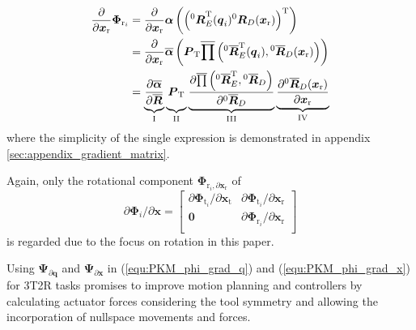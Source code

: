 \documentclass[twocolumn,10pt]{IFTOMM}
\newcommand{\bm}[1]{\boldsymbol{#1}}
\newcommand{\rotmat}[2]{{{ }^{#1}\boldsymbol{R}}_{#2}}
\newcommand{\rotmato}[2]{{{ }^{#1}\boldsymbol{\overline{R}}}_{#2}}
\newcommand{\transp}[0]{{\mathrm{T}}}
\begin{document}
\begin{align}
\frac{\partial}{\partial \bm{x}_{\mathrm{r}}}\bm{\Phi}_{\mathrm{r}_i}
&=
\frac{\partial}{\partial \bm{x}_{\mathrm{r}}} \bm{\alpha}\left(\left(\rotmat{0}{E}^\transp(\bm{q}_i) \rotmat{0}{D}(\bm{x}_{\mathrm{r}})\right)^\transp\right) \label{equ:grad_Phi_x} \\
&=
\frac{\partial}{\partial \bm{x}_{\mathrm{r}}} \overline{\bm{\alpha}}\left(
\bm{P}_{\mathrm{T}}
\overline{\prod}\left( \rotmato{0}{E}^\transp(\bm{q}_i), \rotmato{0}{D}(\bm{x}_{\mathrm{r}})\right)\right) \nonumber \\
&=
\underbrace{\vphantom{\frac{\partial \overline{\prod}\left( \rotmato{0}{E}^\transp, \rotmato{0}{D}\right)}{\partial \rotmato{0}{D}}}
    \frac{\partial \overline{\bm{\alpha}}}{\partial \overline{\bm{R}}}}_{\mathrm{I}}
\underbrace{\vphantom{\frac{\partial \overline{\prod}\left( \rotmato{0}{E}^\transp, \rotmato{0}{D}\right)}{\partial \rotmato{0}{D}}}
    \bm{P}_{\mathrm{T}}}_{\mathrm{II}}
\underbrace{\frac{\partial \overline{\prod}\left( \rotmato{0}{E}^\transp, \rotmato{0}{D}\right)}{\partial \rotmato{0}{D}}}_{\mathrm{III}}
\underbrace{\frac{\partial \rotmato{0}{D}(\bm{x}_{\mathrm{r}})}{\partial \bm{x}_{\mathrm{r}}}}_{\mathrm{IV}} \nonumber
\end{align}
%
where the simplicity of the single expression is demonstrated in appendix\,\ref{sec:appendix_gradient_matrix}.

Again, only the rotational component $\bm{\Phi}_{\mathrm{r}_i,\partial \bm{x}_{\mathrm{r}}}$ of 
%
\begin{equation}
\partial \bm{\Phi}_i/\partial \bm{x}
=
\begin{bmatrix}
\partial\bm{\Phi}_{\mathrm{t}_i}/\partial \bm{x}_{\mathrm{t}} & \partial\bm{\Phi}_{\mathrm{t}_i}/\partial \bm{x}_{\mathrm{r}} \\
\bm{0} & \partial\bm{\Phi}_{\mathrm{r}_i}/\partial \bm{x}_{\mathrm{r}} \\
\end{bmatrix}
\end{equation}
is regarded due to the focus on rotation in this paper.

Using $\bm{\Psi}_{\partial \bm{q}}$ and $\bm{\Psi}_{\partial \bm{x}}$ in (\ref{equ:PKM_phi_grad_q}) and (\ref{equ:PKM_phi_grad_x}) for 3T2R tasks promises to improve motion planning and controllers by calculating actuator forces considering the tool symmetry and allowing the incorporation of nullspace movements and forces.
\end{document}

